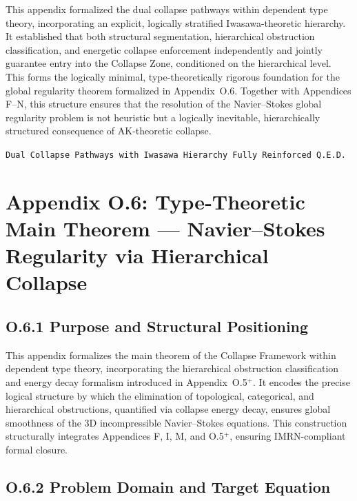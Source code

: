 \documentclass[11pt]{article}
\begin{document}
This appendix formalized the dual collapse pathways within dependent type theory, incorporating an explicit, logically stratified Iwasawa-theoretic hierarchy.  
It established that both structural segmentation, hierarchical obstruction classification, and energetic collapse enforcement independently and jointly guarantee entry into the Collapse Zone, conditioned on the hierarchical level.  
This forms the logically minimal, type-theoretically rigorous foundation for the global regularity theorem formalized in Appendix~O.6.  
Together with Appendices F–N, this structure ensures that the resolution of the Navier--Stokes global regularity problem is not heuristic but a logically inevitable, hierarchically structured consequence of AK-theoretic collapse.

\begin{flushright}
\texttt{Dual Collapse Pathways with Iwasawa Hierarchy \quad Fully Reinforced \quad Q.E.D.}
\end{flushright}



\section*{Appendix O.6: Type-Theoretic Main Theorem — Navier–Stokes Regularity via Hierarchical Collapse}

\subsection*{O.6.1 Purpose and Structural Positioning}

This appendix formalizes the main theorem of the Collapse Framework within dependent type theory, incorporating the hierarchical obstruction classification and energy decay formalism introduced in Appendix~O.5$^+$.  
It encodes the precise logical structure by which the elimination of topological, categorical, and hierarchical obstructions, quantified via collapse energy decay, ensures global smoothness of the 3D incompressible Navier–Stokes equations.  
This construction structurally integrates Appendices F, I, M, and O.5$^+$, ensuring IMRN-compliant formal closure.

\subsection*{O.6.2 Problem Domain and Target Equation}
\end{document}
